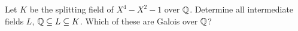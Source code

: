 \begin{problem}
  Let \(K\) be the splitting field of \(X^4-X^2-1\) over
  \(\mathbb{Q}\). Determine all intermediate fields \(L\),
  \(\mathbb{Q}\subseteq L\subseteq K\). Which of these are Galois over \(\mathbb{Q}\)?
\end{problem}
\begin{solution}
\end{solution}

